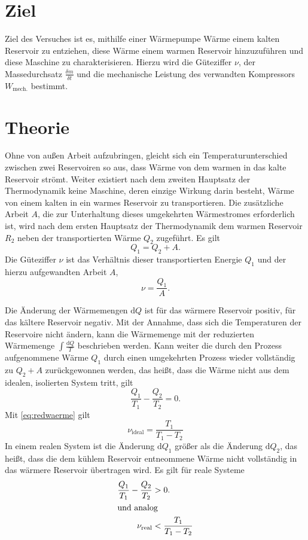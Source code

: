 \section{Ziel}
\label{sec:Ziel}
Ziel des Versuches ist es, mithilfe einer Wärmepumpe Wärme einem kalten Reservoir zu entziehen, diese Wärme einem warmen Reservoir hinzuzuführen und diese Maschine zu charakterisieren.
Hierzu wird die Güteziffer $\nu$, der Massedurchsatz $\frac{\delta{m}}{\delta{t}}$ und die mechanische Leistung des verwandten Kompressors $W_\text{mech.}$ bestimmt.
\section{Theorie}
\label{sec:Theorie}
Ohne von außen Arbeit aufzubringen, gleicht sich ein Temperaturunterschied zwischen zwei Reservoiren so aus, 
dass Wärme von dem warmen in das kalte Reservoir strömt.
Weiter existiert nach dem zweiten Hauptsatz der Thermodynamik keine Maschine, deren einzige Wirkung darin besteht, Wärme von einem kalten in ein warmes Reservoir zu transportieren\cite{hauptsaetzederthermodynamik}.
Die zusätzliche Arbeit $A$, die zur Unterhaltung dieses umgekehrten Wärmestromes erforderlich ist, wird nach dem ersten Hauptsatz der Thermodynamik dem warmen Reservoir $R_2$ neben der transportierten Wärme $Q_2$ %
zugeführt.
Es gilt\\
\begin{equation}
	Q_1 = Q_2+A.
	\label{eq:waermetransport}
\end{equation}
Die Güteziffer $\nu$ ist das Verhältnis dieser transportierten Energie $Q_1$ und der hierzu aufgewandten Arbeit $A$,
\begin{equation}
	\nu = \frac{Q_1}{A}.
	\label{eq:gueteziffer}
\end{equation}

\noindent Die Änderung der Wärmemengen $\mathup{d}Q$ ist für das wärmere Reservoir positiv, für das kältere Reservoir negativ.
Mit der Annahme, dass sich die Temperaturen der Reservoire nicht ändern, kann die Wärmemenge mit der reduzierten Wärmemenge $\int \frac{\mathup{d}Q}{T}$ beschrieben werden. 
Kann weiter die durch den Prozess aufgenommene Wärme $Q_1$ durch einen umgekehrten Prozess wieder vollständig zu $Q_2 + A$ zurückgewonnen werden, das heißt, dass die Wärme nicht aus dem idealen, isolierten System tritt, gilt
\begin{equation}
	\frac{Q_1}{T_1}-\frac{Q_2}{T_2} = 0.
	\label{eq:redwaemre}
\end{equation}
Mit \ref{eq:redwaerme} gilt 
\begin{equation}
	\nu_{\text{ideal}} = \frac{T_1}{T_1-T_2}
\end{equation}
In einem realen System ist die Änderung $\mathup{d}Q_1$ größer als die Änderung $\mathup{d}Q_2$, das heißt, dass die dem kühlem Reservoir entneommene Wärme nicht vollständig in das wärmere Reservoir übertragen wird.
Es gilt für reale Systeme
\begin{align}
	\frac{Q_1}{T_1}-\frac{Q_2}{T_2} &> 0.\\
	\intertext{und analog}
	\nu_{\text{real}} &< \frac{T_1}{T_1-T_2}
\end{align}